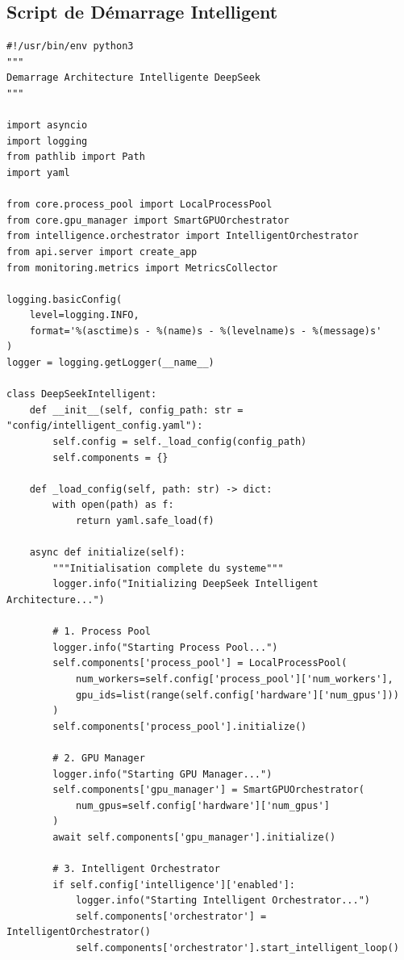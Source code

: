 \documentclass[12pt,a4paper]{article}
\begin{document}
\subsection{Script de Démarrage Intelligent}

\begin{lstlisting}[caption={start\_intelligent.py}]
#!/usr/bin/env python3
"""
Demarrage Architecture Intelligente DeepSeek
"""

import asyncio
import logging
from pathlib import Path
import yaml

from core.process_pool import LocalProcessPool
from core.gpu_manager import SmartGPUOrchestrator
from intelligence.orchestrator import IntelligentOrchestrator
from api.server import create_app
from monitoring.metrics import MetricsCollector

logging.basicConfig(
    level=logging.INFO,
    format='%(asctime)s - %(name)s - %(levelname)s - %(message)s'
)
logger = logging.getLogger(__name__)

class DeepSeekIntelligent:
    def __init__(self, config_path: str = "config/intelligent_config.yaml"):
        self.config = self._load_config(config_path)
        self.components = {}
        
    def _load_config(self, path: str) -> dict:
        with open(path) as f:
            return yaml.safe_load(f)
            
    async def initialize(self):
        """Initialisation complete du systeme"""
        logger.info("Initializing DeepSeek Intelligent Architecture...")
        
        # 1. Process Pool
        logger.info("Starting Process Pool...")
        self.components['process_pool'] = LocalProcessPool(
            num_workers=self.config['process_pool']['num_workers'],
            gpu_ids=list(range(self.config['hardware']['num_gpus']))
        )
        self.components['process_pool'].initialize()
        
        # 2. GPU Manager
        logger.info("Starting GPU Manager...")
        self.components['gpu_manager'] = SmartGPUOrchestrator(
            num_gpus=self.config['hardware']['num_gpus']
        )
        await self.components['gpu_manager'].initialize()
        
        # 3. Intelligent Orchestrator
        if self.config['intelligence']['enabled']:
            logger.info("Starting Intelligent Orchestrator...")
            self.components['orchestrator'] = IntelligentOrchestrator()
            self.components['orchestrator'].start_intelligent_loop()
            

\end{lstlisting}
\end{document}
